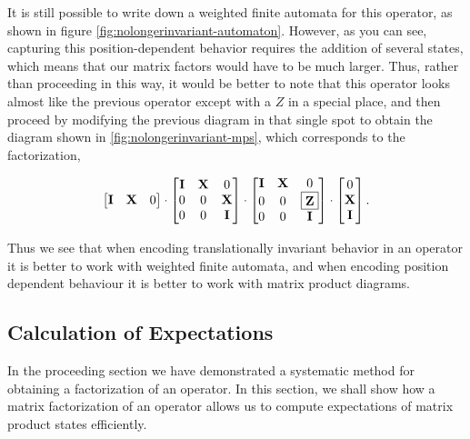 \documentclass[12pt]{amsbook}
\theoremstyle{plain}
\theoremstyle{definition}
\theoremstyle{remark}
\begin{document}
It is still possible to write down a weighted finite automata for this operator, as shown in figure \ref{fig:nolongerinvariant-automaton}.  However, as you can see, capturing this position-dependent behavior requires the addition of several states, which means that our matrix factors would have to be much larger.  Thus, rather than proceeding in this way, it would be better to note that this operator looks almost like the previous operator except with a $Z$ in a special place, and then proceed by modifying the previous diagram in that single spot to obtain the diagram shown in \ref{fig:nolongerinvariant-mps}, which corresponds to the factorization,

$$
\begin{bmatrix}
\textbf{I} & \textbf{X} & 0 \\
\end{bmatrix}
\cdot
\begin{bmatrix}
\textbf{I} & \textbf{X} & 0 \\
0 & 0 & \textbf{X} \\
0 & 0 & \textbf{I} \\
\end{bmatrix}
\cdot
\begin{bmatrix}
\textbf{I} & \textbf{X} & 0 \\
0 & 0 & \fbox{\textbf{Z}} \\
0 & 0 & \textbf{I} \\
\end{bmatrix}
\cdot
\begin{bmatrix}
0 \\
\textbf{X} \\
\textbf{I} \\
\end{bmatrix}.
$$

Thus we see that when encoding translationally invariant behavior in an operator it is better to work with weighted finite automata, and when encoding position dependent behaviour it is better to work with matrix product diagrams.
\subsection{Calculation of Expectations}

\label{calcexp}

In the proceeding section we have demonstrated a systematic method for obtaining a factorization of an operator.  In this section, we shall show how a matrix factorization of an operator allows us to compute expectations of matrix product states efficiently.
\end{document}
